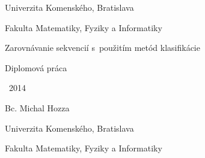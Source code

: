 \documentclass[a4paper,12pt,openany,oneside,headings=optiontohead]{scrbook} %
\renewcommand\baselinestretch{1.3} %
\theoremstyle{definition}
\def\mftitle{Zarovnávanie sekvencií s~použitím metód klasifikácie}
\def\mfthesistype{Diplomová práca}
\def\mfauthor{Bc. Michal Hozza}
\def\mfdate{2014}
\def\mfuniversity{Univerzita Komenského, Bratislava}
\def\mffakulta{Fakulta Matematiky, Fyziky a Informatiky}
\begin{document}
\pagestyle{plain}
\frontmatter

\thispagestyle{empty}

\noindent
\begin{center}
\begin{minipage}{0.8\textwidth}
\centerline{\renewcommand\baselinestretch{1.3} \LARGE\sc\mfuniversity}
\centerline{\sc\mffakulta}
\end{minipage}
\end{center}

\vfill
\begin{center}
\begin{minipage}{1\textwidth}
\begin{center}
\linespread{1}\LARGE\sc\mftitle
\end{center}
\smallskip
\centerline{\mfthesistype}
\end{minipage}
\end{center}
\vfill
{\bf
\begin{minipage}{0.4\textwidth}
\begin{flushleft} \large
~\mfdate
\end{flushleft}
\end{minipage}
\begin{minipage}{0.59\textwidth}
\begin{flushright} \large
\mfauthor
\end{flushright}
\end{minipage}
}
\eject %

\thispagestyle{empty}

\noindent
\begin{center}
\begin{minipage}{0.8\textwidth}
\centerline{\LARGE\sc\mfuniversity}
\centerline{\sc\mffakulta}
\end{minipage}
\end{center}
\end{document}
